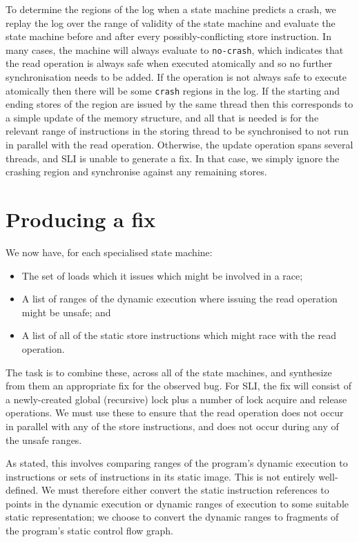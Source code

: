 \documentclass[10pt,letter,twocolumn]{sigplanconf}
\begin{document}
To determine the regions of the log when a state machine predicts a
crash, we replay the log over the range of validity of the state
machine and evaluate the state machine before and after every
possibly-conflicting store instruction.  In many cases, the machine
will always evaluate to \verb|no-crash|, which indicates that the read
operation is always safe when executed atomically and so no further
synchronisation needs to be added.  If the operation is not always
safe to execute atomically then there will be some \verb|crash|
regions in the log.  If the starting and ending stores of the region
are issued by the same thread then this corresponds to a simple update
of the memory structure, and all that is needed is for the relevant
range of instructions in the storing thread to be synchronised to not
run in parallel with the read operation.  Otherwise, the update
operation spans several threads, and SLI is unable to generate a fix.
In that case, we simply ignore the crashing region and synchronise
against any remaining stores.

\section{Producing a fix}
We now have, for each specialised state machine:

\begin{itemize}
\item The set of loads which it issues which might be involved in a
  race;
\item A list of ranges of the dynamic execution where issuing the read
  operation might be unsafe; and
\item A list of all of the static store instructions which might race
  with the read operation.
\end{itemize}

The task is to combine these, across all of the state machines, and
synthesize from them an appropriate fix for the observed bug.  For
SLI, the fix will consist of a newly-created global (recursive) lock
plus a number of lock acquire and release operations.  We must use
these to ensure that the read operation does not occur in parallel
with any of the store instructions, and does not occur during any of
the unsafe ranges.

As stated, this involves comparing ranges of the program's dynamic
execution to instructions or sets of instructions in its static image.
This is not entirely well-defined.  We must therefore either convert
the static instruction references to points in the dynamic execution
or dynamic ranges of execution to some suitable static representation;
we choose to convert the dynamic ranges to fragments of the program's
static control flow graph.
\end{document}
